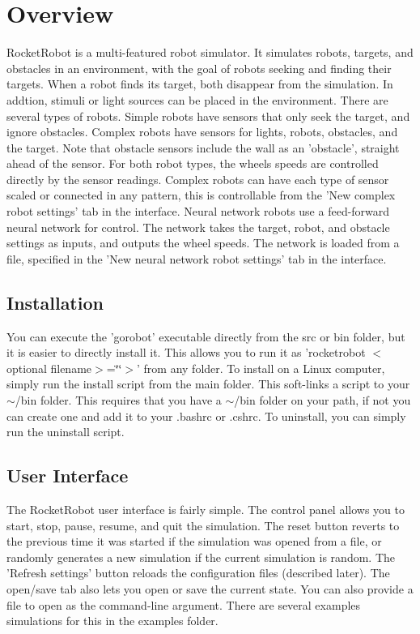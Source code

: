 \hypertarget{index_Overview}{}\section{Overview}\label{index_Overview}
Rocket\-Robot is a multi-\/featured robot simulator. It simulates robots, targets, and obstacles in an environment, with the goal of robots seeking and finding their targets. When a robot finds its target, both disappear from the simulation. In addtion, stimuli or light sources can be placed in the environment. There are several types of robots. Simple robots have sensors that only seek the target, and ignore obstacles. Complex robots have sensors for lights, robots, obstacles, and the target. Note that obstacle sensors include the wall as an 'obstacle', straight ahead of the sensor. For both robot types, the wheels speeds are controlled directly by the sensor readings. Complex robots can have each type of sensor scaled or connected in any pattern, this is controllable from the 'New complex robot settings' tab in the interface. Neural network robots use a feed-\/forward neural network for control. The network takes the target, robot, and obstacle settings as inputs, and outputs the wheel speeds. The network is loaded from a file, specified in the 'New neural network robot settings' tab in the interface. \hypertarget{index_Installation}{}\subsection{Installation}\label{index_Installation}
You can execute the 'gorobot' executable directly from the src or bin folder, but it is easier to directly install it. This allows you to run it as 'rocketrobot $<$optional filename$>$=\char`\"{}\char`\"{}$>$' from any folder. To install on a Linux computer, simply run the install script from the main folder. This soft-\/links a script to your $\sim$/bin folder. This requires that you have a $\sim$/bin folder on your path, if not you can create one and add it to your .bashrc or .cshrc. To uninstall, you can simply run the uninstall script. \hypertarget{index_Interface}{}\subsection{User Interface}\label{index_Interface}
The Rocket\-Robot user interface is fairly simple. The control panel allows you to start, stop, pause, resume, and quit the simulation. The reset button reverts to the previous time it was started if the simulation was opened from a file, or randomly generates a new simulation if the current simulation is random. The 'Refresh settings' button reloads the configuration files (described later). The open/save tab also lets you open or save the current state. You can also provide a file to open as the command-\/line argument. There are several examples simulations for this in the examples folder.

